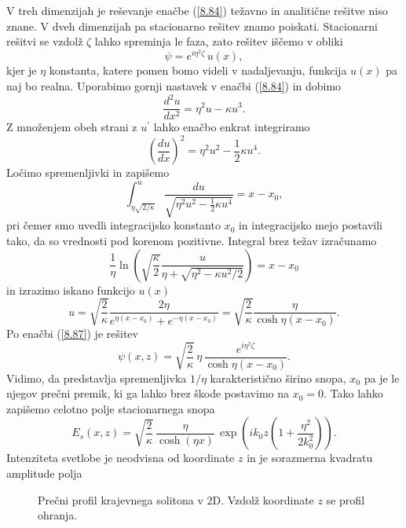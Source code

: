 V treh dimenzijah je reševanje enačbe (\ref{8.84}) težavno in analitične
rešitve niso znane. V dveh dimenzijah pa stacionarno rešitev znamo
poiskati. Stacionarni rešitvi se vzdolž $\zeta$ lahko spreminja le faza, zato
rešitev iščemo v obliki 
\begin{equation}
\psi=e^{i\eta^{2}\zeta}\, u(x),
\label{8.87}
\end{equation}
 kjer je $\eta$ konstanta, katere pomen bomo videli v nadaljevanju, 
 funkcija $u(x)$ pa naj bo realna. 
Uporabimo gornji nastavek v enačbi (\ref{8.84}) in dobimo
\begin{equation}
\frac{d^{2}u}{dx^{2}}=\eta^{2}u-\kappa u^{3}.
\end{equation}
 Z množenjem obeh strani z $u^{\prime}$ lahko enačbo enkrat integriramo
\begin{equation}
\left(\frac{du}{dx}\right)^{2}=\eta^{2}u^{2}-\frac{1}{2}\kappa u^{4}.
\end{equation}
Ločimo spremenljivki in zapišemo 
\begin{equation}
\int_{\eta\sqrt{2/\kappa}}^{u}\frac{du}{\sqrt{\eta^{2}u^2-\frac{1}{2}\kappa u^{4}}}=x-x_{0},
\label{8.85}
\end{equation}
pri čemer smo uvedli integracijsko konstanto $x_{0}$ in integracijsko mejo postavili 
tako, da so vrednosti pod korenom pozitivne.
Integral brez težav izračunamo
\begin{equation}
\frac{1}{\eta}\ln\left(\sqrt{\frac{\kappa}{2}}\frac{u}{\eta+
\sqrt{\eta^{2}-\kappa u^{2}/2}}\right)=x-x_{0}
\end{equation}
in izrazimo iskano funkcijo $u(x)$
\begin{equation}
u=\sqrt{\frac{2}{\kappa}}\frac{2 \eta }{e^{\eta(x-x_{0})}+e^{-\eta(x-x_{0})}}=
\sqrt{\frac{2}{\kappa}}\frac{\eta}{\cosh\eta(x-x_{0})}.
\label{8.86}
\end{equation}
Po enačbi (\ref{8.87}) je rešitev
\begin{equation}
\psi(x,z)=\sqrt{\frac{2}{\kappa}}\,\eta\,\frac{e^{i\eta^{2}\zeta}}{\cosh\eta(x-x_{0})}.
\label{8.88}
\end{equation}
Vidimo, da predstavlja spremenljivka $1/\eta$  karakteristično širino snopa, $x_{0}$ pa
je le njegov prečni premik, ki ga lahko brez škode postavimo na $x_0=0$. Tako
lahko zapišemo celotno polje stacionarnega snopa 
\begin{equation}
E_{s}(x,z)=\sqrt{\frac{2}{\kappa}}\,\frac{\eta}{\cosh(\eta x)}\,\exp\left(ik_{0}z\left(1+
\frac{\eta^{2}}{2k_{0}^{2}}\right)\right).
\label{8.89}
\end{equation}
Intenziteta svetlobe je neodvisna od koordinate $z$ in je sorazmerna kvadratu amplitude polja 
\begin{figure}[h]
\centering
\def\svgwidth{100truemm} 

\caption{Prečni profil krajevnega solitona v 2D. Vzdolž koordinate $z$ se profil ohranja.}
\label{fig:soliton}
\end{figure}

